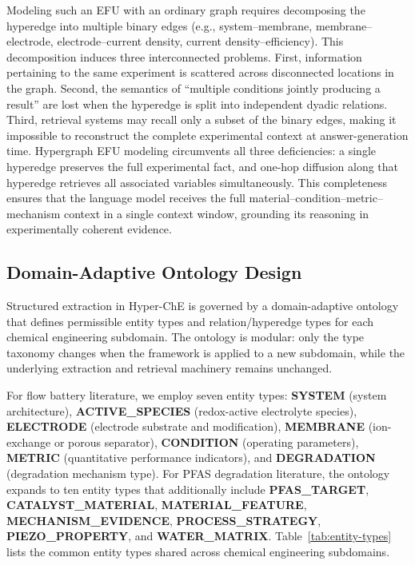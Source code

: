 Modeling such an EFU with an ordinary graph requires decomposing the hyperedge into multiple binary edges (e.g., system--membrane, membrane--electrode, electrode--current density, current density--efficiency). This decomposition induces three interconnected problems. First, information pertaining to the same experiment is scattered across disconnected locations in the graph. Second, the semantics of ``multiple conditions jointly producing a result'' are lost when the hyperedge is split into independent dyadic relations. Third, retrieval systems may recall only a subset of the binary edges, making it impossible to reconstruct the complete experimental context at answer-generation time. Hypergraph EFU modeling circumvents all three deficiencies: a single hyperedge preserves the full experimental fact, and one-hop diffusion along that hyperedge retrieves all associated variables simultaneously. This completeness ensures that the language model receives the full material--condition--metric--mechanism context in a single context window, grounding its reasoning in experimentally coherent evidence.

\subsection{Domain-Adaptive Ontology Design}
\label{subsec:ontology}

Structured extraction in Hyper-ChE is governed by a domain-adaptive ontology that defines permissible entity types and relation/hyperedge types for each chemical engineering subdomain. The ontology is modular: only the type taxonomy changes when the framework is applied to a new subdomain, while the underlying extraction and retrieval machinery remains unchanged.

For flow battery literature, we employ seven entity types: \textbf{SYSTEM} (system architecture), \textbf{ACTIVE\_SPECIES} (redox-active electrolyte species), \textbf{ELECTRODE} (electrode substrate and modification), \textbf{MEMBRANE} (ion-exchange or porous separator), \textbf{CONDITION} (operating parameters), \textbf{METRIC} (quantitative performance indicators), and \textbf{DEGRADATION} (degradation mechanism type). For PFAS degradation literature, the ontology expands to ten entity types that additionally include \textbf{PFAS\_TARGET}, \textbf{CATALYST\_MATERIAL}, \textbf{MATERIAL\_FEATURE}, \textbf{MECHANISM\_EVIDENCE}, \textbf{PROCESS\_STRATEGY}, \textbf{PIEZO\_PROPERTY}, and \textbf{WATER\_MATRIX}. Table~\ref{tab:entity-types} lists the common entity types shared across chemical engineering subdomains.


